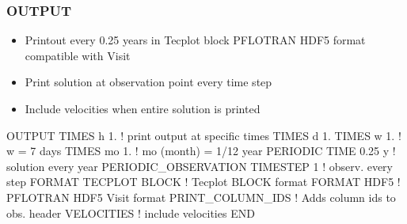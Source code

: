 \documentclass{beamer}
\newcommand\bluecomment[1]{{{\color{blue} #1}}}
\begin{document}
\begin{frame}[fragile]\frametitle{\bf OUTPUT}
\vspace{-1mm}
\begin{itemize}
\item Printout every 0.25 years in Tecplot block PFLOTRAN HDF5 format compatible with Visit
\item Print solution at observation point every time step
\item Include velocities when entire solution is printed
\end{itemize}
\vspace{-4mm}
\begin{semiverbatim}
OUTPUT
  TIMES h  1. \bluecomment{! print output at specific times}
  TIMES d  1.
  TIMES w  1.          \bluecomment{! w = 7 days}
  TIMES mo 1.          \bluecomment{! mo (month) = 1/12 year}
  PERIODIC TIME 0.25 y     \bluecomment{! solution every year}
  PERIODIC_OBSERVATION TIMESTEP 1  \bluecomment{! observ. every step}
  FORMAT TECPLOT BLOCK \bluecomment{! Tecplot BLOCK format}
  FORMAT HDF5          \bluecomment{! PFLOTRAN HDF5 Visit format}
  PRINT_COLUMN_IDS     \bluecomment{! Adds column ids to obs. header}
  VELOCITIES           \bluecomment{! include velocities}
END
\end{semiverbatim}

\end{frame}
\end{document}
